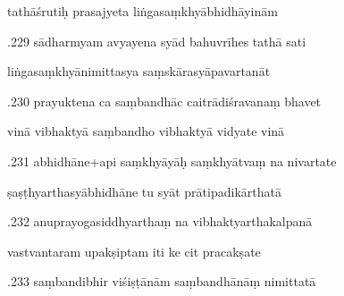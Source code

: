 \documentclass[article,12pt,a4paper]{memoir}%
\newcounter{parCount}
\begin{document}
	  
	  \pstart \leavevmode%
	tathāśrutiḥ prasajyeta liṅgasaṃkhyābhidhāyinām 
	{}
	\pend%
      

	  
	  \pstart {}.229 sādharmyam avyayena syād bahuvrīhes tathā sati 
	{}
	\pend%
      

	  
	  \pstart \leavevmode%
	liṅgasaṃkhyānimittasya saṃskārasyāpavartanāt 
	{}
	\pend%
      

	  
	  \pstart {}.230 prayuktena ca saṃbandhāc caitrādiśravanaṃ bhavet 
	{}
	\pend%
      

	  
	  \pstart \leavevmode%
	vinā vibhaktyā saṃbandho vibhaktyā vidyate vinā 
	{}
	\pend%
      

	  
	  \pstart {}.231 abhidhāne+api saṃkhyāyāḥ saṃkhyātvaṃ na nivartate 
	{}
	\pend%
      

	  
	  \pstart \leavevmode%
	ṣaṣṭhyarthasyābhidhāne tu syāt prātipadikārthatā 
	{}
	\pend%
      

	  
	  \pstart {}.232 anuprayogasiddhyarthaṃ na vibhaktyarthakalpanā 
	{}
	\pend%
      

	  
	  \pstart \leavevmode%
	vastvantaram upakṣiptam iti ke cit pracakṣate 
	{}
	\pend%
      

	  
	  \pstart {}.233 saṃbandibhir viśiṣṭānām saṃbandhānāṃ nimittatā 
	{}
	\pend%
      
\end{document}
